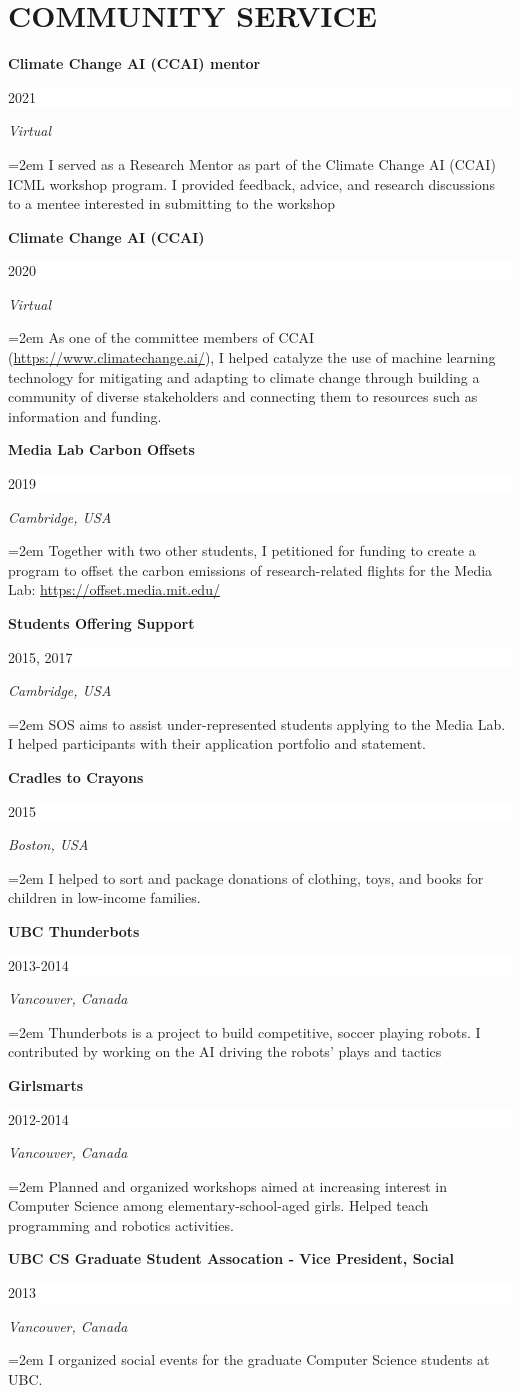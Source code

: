 \documentclass[paper=letter,fontsize=11pt]{scrartcl} %
\newcommand{\sepspace}{\vspace*{1em}}		%
\newcommand{\NewPart}[2]{\section*{\uppercase{#1} #2}}
\newcommand{\EducationEntry}[3]{
		\noindent \textbf{#1} \hfill      %
		\colorbox{White}{%
			\parbox{10em}{%
			\hfill\color{Black}#2}} \par  %
		\noindent \textit{#3} \par}
\newcommand{\ServiceEntry}[4]{
		\noindent \textbf{#1} \hfill      %
		\colorbox{White}{%
			\parbox{10em}{%
			\hfill\color{Black}#2}} \par  %
		\noindent \textit{#3} \par  %
		\noindent\hangindent=2em\hangafter=0 \small #4 %
		\normalsize \par}
\begin{document}
\NewPart{Community Service}{}


\ServiceEntry{Climate Change AI (CCAI) mentor}{2021}{Virtual}
{I served as a Research Mentor as part of the Climate Change AI (CCAI) ICML workshop program. I provided feedback, advice, and research discussions to a mentee interested in submitting to the workshop}
\sepspace

\ServiceEntry{Climate Change AI (CCAI)}{2020}{Virtual}
{As one of the committee members of CCAI (\url{https://www.climatechange.ai/}), I helped catalyze the use of machine learning technology for mitigating and adapting to climate change through building a community of diverse stakeholders and connecting them to resources such as information and funding.}
\sepspace

\ServiceEntry{Media Lab Carbon Offsets}{2019}{Cambridge, USA}
{Together with two other students, I petitioned for funding to create a program to offset the carbon emissions of research-related flights for the Media Lab: \url{https://offset.media.mit.edu/}}
\sepspace

\ServiceEntry{Students Offering Support}{2015, 2017}{Cambridge, USA}
{SOS aims to assist under-represented students applying to the Media Lab. I helped participants with their application portfolio and statement.}
\sepspace

\ServiceEntry{Cradles to Crayons}{2015}{Boston, USA}
{I helped to sort and package donations of clothing, toys, and books for children in low-income families.}
\sepspace

\ServiceEntry{UBC Thunderbots}{2013-2014}{Vancouver, Canada}
{Thunderbots is a project to build competitive, soccer playing robots. I contributed by working on the AI driving the robots' plays and tactics}
\sepspace

\ServiceEntry{Girlsmarts}{2012-2014}{Vancouver, Canada}
{Planned and organized workshops aimed at increasing interest in Computer Science among elementary-school-aged girls. Helped teach programming and robotics activities.}
\sepspace

\ServiceEntry{UBC CS Graduate Student Assocation - Vice President, Social }{2013}{Vancouver, Canada}
{I organized social events for the graduate Computer Science students at UBC.}
\sepspace
\end{document}
